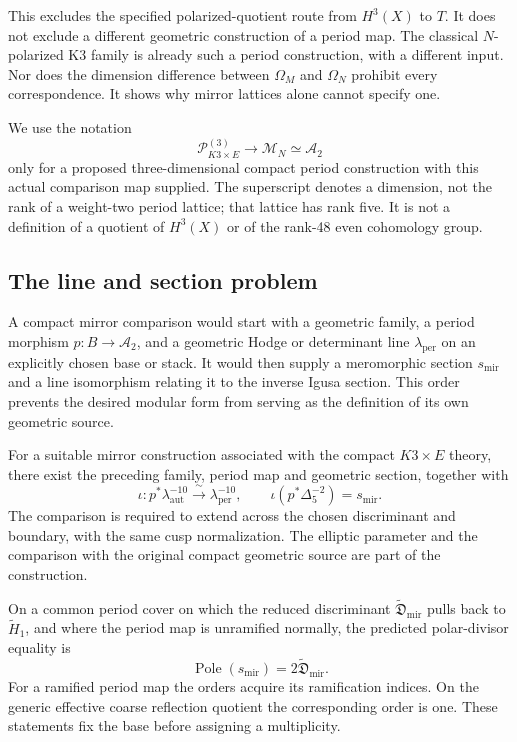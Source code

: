 This excludes the specified polarized-quotient route from
\(H^3(X)\) to \(T\). It does not exclude a different geometric
construction of a period map. The classical \(N\)-polarized K3
family is already such a period construction, with a different
input. Nor does the dimension difference between \(\Omega_M\)
and \(\Omega_N\) prohibit every correspondence. It shows why
mirror lattices alone cannot specify one.

We use the notation
\begin{equation}\label{eq:view4-k3e-moduli}
 \mathcal P_{K3\times E}^{(3)}\longrightarrow
 \mathcal M_N\simeq\mathcal A_2
\end{equation}
only for a proposed three-dimensional compact period construction
with this actual comparison map supplied.
The superscript denotes a dimension, not the rank of a
weight-two period lattice; that lattice has rank five.
It is not a definition of a quotient of \(H^3(X)\) or of the
rank-48 even cohomology group.

\subsection{The line and section problem}
\label{subsec:view4-conjecture}

A compact mirror comparison would start with a geometric family,
a period morphism \(p:B\to\mathcal A_2\), and a geometric Hodge
or determinant line \(\lambda_{\mathrm{per}}\) on an explicitly
chosen base or stack. It would then supply a meromorphic section
\(s_{\mathrm{mir}}\) and a line isomorphism relating it to the
inverse Igusa section. This order prevents the desired modular
form from serving as the definition of its own geometric source.

\begin{conjecture}
\label{conj:mirror-discriminant}
For a suitable mirror construction associated with the compact
\(K3\times E\) theory, there exist the preceding family, period
map and geometric section, together with
\[
 \iota:p^*\lambda_{\mathrm{aut}}^{-10}
             \xrightarrow{\ \sim\ }\lambda_{\mathrm{per}}^{-10},
 \qquad
 \iota(p^*\Delta_5^{-2})=s_{\mathrm{mir}}.
\]
The comparison is required to extend across the chosen
discriminant and boundary, with the same cusp normalization.
The elliptic parameter and the comparison with the original compact
geometric source are part of the construction.
\end{conjecture}

On a common period cover on which the reduced discriminant
\(\widetilde{\mathfrak D}_{\mathrm{mir}}\) pulls back to
\(\widetilde H_1\), and where the period map is unramified normally,
the predicted polar-divisor equality is
\begin{equation}\label{eq:view4-divisor-equation}
 \operatorname{Pole}(s_{\mathrm{mir}})
       =2\widetilde{\mathfrak D}_{\mathrm{mir}}.
\end{equation}
For a ramified period map the orders acquire its ramification
indices. On the generic effective coarse reflection quotient the
corresponding order is one. These statements fix the base before
assigning a multiplicity.

